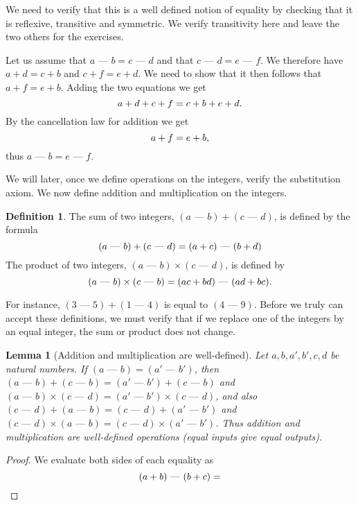 \documentclass[a4paper, twocolumn]{report}
\newcounter{dummy} \numberwithin{dummy}{section}
\newcounter{exercise} \numberwithin{exercise}{section}
\newtheorem{lma}[dummy]{Lemma}
\theoremstyle{definition}
\newtheorem{defn}[dummy]{Definition}
\theoremstyle{solution}
\newcommand{\dash}{\text{ --- }}
\begin{document}
We need to verify that this is a well defined notion of equality by checking
that it is reflexive, transitive and symmetric. We verify transitivity here
and leave the two others for the exercises.

Let us assume that $a \dash b = c \dash d$ and that $c \dash d = e \dash f$.
We therefore have $a + d = c + b$ and $c + f = e + d$. We need to show that it
then follows that $a + f = e + b$. Adding the two equations we get
\begin{equation}
  \notag
  a + d + c + f = c + b + e + d.
\end{equation}
By the cancellation law for addition we get
\begin{equation}
  \notag
  a + f = e + b, 
\end{equation}
thus $a \dash b = e \dash f$.

We will later, once we define operations on the integers, verify the
substitution axiom.  We now define addition and multiplication on the integers.

\begin{defn}
  \label{defn_412}
  The sum of two integers, $(a\dash b) + (c \dash d)$, is defined by the formula
  \begin{equation}
    \notag
    (a \dash b) + (c \dash d) = (a + c) \dash (b + d)
  \end{equation}
  The product of two integers, $(a \dash b) \times (c \dash d)$, is defined by
  \begin{equation}
    \notag
    (a \dash b) \times (c \dash b) = (ac + bd) \dash (ad + bc).
  \end{equation}
\end{defn}

For instance, $(3 \dash 5) + (1 \dash 4)$ is equal to $(4 \dash 9)$. Before we truly can accept
these definitions, we must verify that if we replace one of the integers by an equal integer, the sum or product
does not change.

\begin{lma}[Addition and multiplication are well-defined]
  \label{lma_413} 
  Let $a, b, a', b', c, d$ be natural numbers. If $(a \dash b) = (a' \dash
    b')$, then $(a \dash b) + (c \dash b) = (a' \dash b') + (c \dash b)$ and $(a
    \dash b) \times (c \dash d) = (a' \dash b') \times (c \dash d)$, and also $(c
  \dash d) + (a \dash b) = (c \dash d) + (a' \dash b')$ and $(c \dash d) \times
  (a \dash b) = (c \dash d) \times (a' \dash b')$. Thus addition and
  multiplication are well-defined operations (equal inputs give equal outputs).
\end{lma}
\begin{proof}
  We evaluate both sides of each equality as
  \begin{equation}
    \notag
    (a + b) \dash (b + c) = 
  \end{equation}
\end{proof}

\todos
\end{document}
